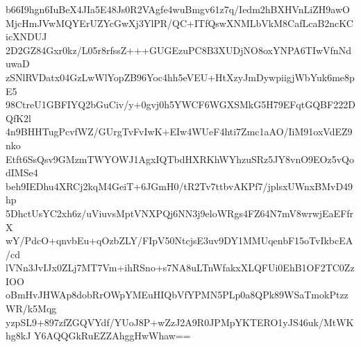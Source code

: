b66I9hgn6IuBeX4JIa5E48Js0R2VAgfe4wuBmgv61z7q/Iedm2hBXHVnLiZH9awO
MjcHmJVwMQYErUZYcGwXj3YlPR/QC+ITfQswXNMLbVkM8CafLcaB2ncKCicXNDUJ
2D2GZ84Gxr0kz/L05r8rfssZ+++GUGEzuPC8B3XUDjNO8oxYNPA6TIwVfnNduwaD
zSNlRVDatx04GzLwWlYopZB96Yoc4hh5eVEU+HtXzyJmDywpiigjWbYuk6me8pE5
98CtreU1GBFIYQ2bGuCiv/y+0gvj0h5YWCF6WGXSMkG5H79EFqtGQBF222DQfK2l
4n9BHHTugPcvfWZ/GUrgTvFvIwK+EIw4WUeF4hti7Zmc1aAO/IiM91oxVdEZ9nko
Etft6SsQsv9GMzmTWYOWJ1AgxIQTbdHXRKhWYhzuSRz5JY8vnO9EOz5vQodIMSe4
beh9IEDhu4XRCj2kqM4GeiT+6JGmH0/tR2Tv7ttbvAKPf7/jplsxUWnxBMvD49hp
5DhctUsYC2xh6z/uViuvsMptVNXPQj6NN3j9eloWRgs4FZ64N7mV8wrwjEaEFfrX
wY/PdcO+qnvbEu+qOzbZLY/FIpV50NtcjsE3uv9DY1MMUqenbF15oTvIkbcEA/cd
lVNn3JvIJx0ZLj7MT7Vm+ihRSno+s7NA8uLTnWfakxXLQFUi0EhB1OF2TC0ZzIOO
oBmHvJHWAp8dobRrOWpYMEuHIQbVfYPMN5PLp0a8QPk89WSaTmokPtzzWR/k5Mqg
yzpSL9+897zfZGQVYdf/YUoJ8P+wZzJ2A9R0JPMpYKTERO1yJS46uk/MtWKhg8kJ
Y6AQQGkRuEZZAhggHwWhaw==

